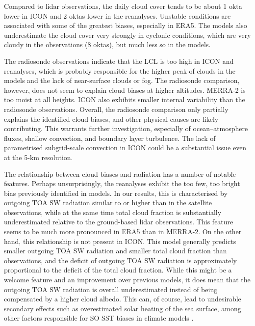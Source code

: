 \documentclass[12pt,a4paper]{article}
\begin{document}
Compared to lidar observations, the daily cloud cover tends to be about 1 okta
lower in ICON and 2 oktas lower in the reanalyses.  Unstable conditions are
associated with some of the greatest biases, especially in ERA5.  The models
also underestimate the cloud cover very strongly in cyclonic conditions, which
are very cloudy in the observations (8 oktas), but much less so in the models.

The radiosonde observations indicate that the LCL is too high in ICON and
reanalyses, which is probably responsible for the higher peak of clouds in the
models and the lack of near-surface clouds or fog. The radiosonde comparison,
however, does not seem to explain cloud biases at higher altitudes.  MERRA-2 is
too moist at all heights.  ICON also exhibits smaller internal variability than
the radiosonde observations. Overall, the radiosonde comparison only
partially explains the identified cloud biases, and other physical causes are
likely contributing.  This warrants further investigation, especially of
ocean--atmosphere fluxes, shallow convection, and boundary layer turbulence.
The lack of parametrised subgrid-scale convection in ICON could be a
substantial issue even at the 5-km resolution.

The relationship between cloud biases and radiation has a number of notable
features. Perhaps unsurprisingly, the reanalyses exhibit the too few, too
bright bias previously identified in models. In our results, this is
characterised by outgoing TOA SW radiation similar to or higher than in the
satellite observations, while at the same time total cloud fraction is
substantially underestimated relative to the ground-based lidar observations.
This feature seems to be much more pronounced in ERA5 than in MERRA-2. On the
other hand, this relationship is not present in ICON. This model generally
predicts smaller outgoing TOA SW radiation and smaller total cloud fraction
than observations, and the deficit of outgoing TOA SW radiation is
approximately proportional to the deficit of the total cloud fraction. While this
might be a welcome feature and an improvement over previous models, it does
mean that the outgoing TOA SW radiation is overall underestimated instead of
being compensated by a higher cloud albedo. This can, of course, lead to
undesirable secondary effects such as overestimated solar heating of the sea
surface, among other factors responsible for SO SST biases in climate models
\citep{zhang2023,luo2023}.
\end{document}

